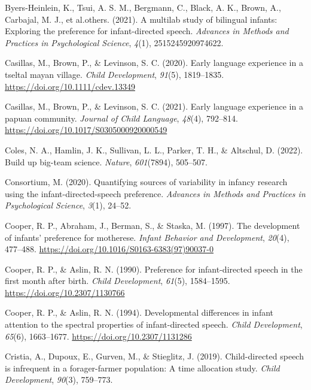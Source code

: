 \documentclass[
  english,
  ,man,floatsintext]{apa6}
\newlength{\cslhangindent}
\newenvironment{CSLReferences}[2] %
 {\begin{list}{}{%
  \setlength{\itemindent}{0pt}
  \setlength{\leftmargin}{0pt}
  \setlength{\parsep}{0pt}
  \ifodd #1
   \setlength{\leftmargin}{\cslhangindent}
   \setlength{\itemindent}{-1\cslhangindent}
  \fi
  \setlength{\itemsep}{#2\baselineskip}}}
 {\end{list}}
\begin{document}
\begin{CSLReferences}{1}{0}
Byers-Heinlein, K., Tsui, A. S. M., Bergmann, C., Black, A. K., Brown, A., Carbajal, M. J., et al.others. (2021). A multilab study of bilingual infants: Exploring the preference for infant-directed speech. \emph{Advances in Methods and Practices in Psychological Science}, \emph{4}(1), 2515245920974622.

Casillas, M., Brown, P., \& Levinson, S. C. (2020). Early language experience in a tseltal mayan village. \emph{Child Development}, \emph{91}(5), 1819--1835. \url{https://doi.org/10.1111/cdev.13349}

Casillas, M., Brown, P., \& Levinson, S. C. (2021). Early language experience in a papuan community. \emph{Journal of Child Language}, \emph{48}(4), 792--814. \url{https://doi.org/10.1017/S0305000920000549}

Coles, N. A., Hamlin, J. K., Sullivan, L. L., Parker, T. H., \& Altschul, D. (2022). Build up big-team science. \emph{Nature}, \emph{601}(7894), 505--507.

Consortium, M. (2020). Quantifying sources of variability in infancy research using the infant-directed-speech preference. \emph{Advances in Methods and Practices in Psychological Science}, \emph{3}(1), 24--52.

Cooper, R. P., Abraham, J., Berman, S., \& Staska, M. (1997). The development of infants' preference for motherese. \emph{Infant Behavior and Development}, \emph{20}(4), 477--488. \url{https://doi.org/10.1016/S0163-6383(97)90037-0}

Cooper, R. P., \& Aslin, R. N. (1990). Preference for infant-directed speech in the first month after birth. \emph{Child Development}, \emph{61}(5), 1584--1595. \url{https://doi.org/10.2307/1130766}

Cooper, R. P., \& Aslin, R. N. (1994). Developmental differences in infant attention to the spectral properties of infant-directed speech. \emph{Child Development}, \emph{65}(6), 1663--1677. \url{https://doi.org/10.2307/1131286}

Cristia, A., Dupoux, E., Gurven, M., \& Stieglitz, J. (2019). Child-directed speech is infrequent in a forager-farmer population: A time allocation study. \emph{Child Development}, \emph{90}(3), 759--773.


\end{CSLReferences}
\end{document}
